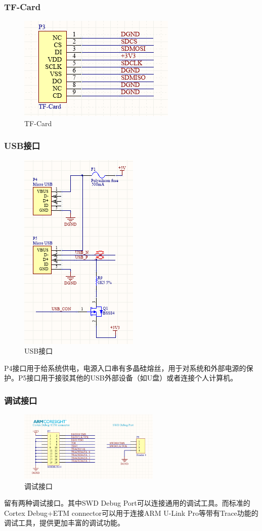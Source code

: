 \documentclass[16pt,a4paper]{article}
\begin{document}
\subsubsection{TF-Card}
\begin{figure}[H]
\centering
\includegraphics[scale = 0.8]{TF-Card.png}
\caption{TF-Card} 
\end{figure}

\subsubsection{USB接口}
\begin{figure}[H]
\centering
\includegraphics[scale = 1]{USB.png}
\caption{USB接口} 
\end{figure}

P4接口用于给系统供电，电源入口串有多晶硅熔丝，用于对系统和外部电源的保护。P5接口用于接驳其他的USB外部设备（如U盘）或者连接个人计算机。

\subsubsection{调试接口}
\begin{figure}[H]
\centering
\includegraphics[width=0.6\textwidth]{debug.png}
\caption{调试接口} 
\end{figure}
留有两种调试接口。其中SWD Debug Port可以连接通用的调试工具。而标准的Cortex Debug+ETM connector可以用于连接ARM U-Link Pro等带有Trace功能的调试工具，提供更加丰富的调试功能。
\end{document}
